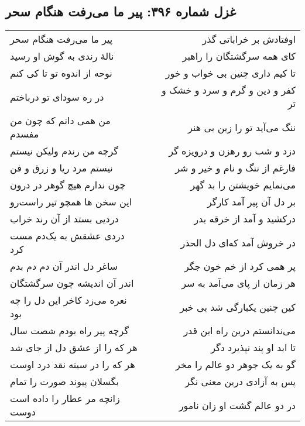 \begin{center}
\section*{غزل شماره ۳۹۶: پیر ما می‌رفت هنگام سحر}
\label{sec:396}
\begin{longtable}{l p{0.5cm} r}
پیر ما می‌رفت هنگام سحر
&&
اوفتادش بر خراباتی گذر
\\
نالهٔ رندی به گوش او رسید
&&
کای همه سرگشتگان را راهبر
\\
نوحه از اندوه تو تا کی کنم
&&
تا کیم داری چنین بی خواب و خور
\\
در ره سودای تو درباختم
&&
کفر و دین و گرم و سرد و خشک و تر
\\
من همی دانم که چون من مفسدم
&&
ننگ می‌آید تو را زین بی هنر
\\
گرچه من رندم ولیکن نیستم
&&
دزد و شب رو رهزن و درویزه گر
\\
نیستم مرد ریا و زرق و فن
&&
فارغم از ننگ و نام و خیر و شر
\\
چون ندارم هیچ گوهر در درون
&&
می‌نمایم خویشتن را بد گهر
\\
این سخن ها همچو تیر راست‌رو
&&
بر دل آن پیر آمد کارگر
\\
دردیی بستد از آن رند خراب
&&
درکشید و آمد از خرقه بدر
\\
دردی عشقش به یک‌دم مست کرد
&&
در خروش آمد که‌ای دل الحذر
\\
ساغر دل اندر آن دم دم بدم
&&
پر همی کرد از خم خون جگر
\\
اندر آن اندیشه چون سرگشتگان
&&
هر زمان از پای می‌آمد به سر
\\
نعره می‌زد کاخر این دل را چه بود
&&
کین چنین یکبارگی شد بی خبر
\\
گرچه پیر راه بودم شصت سال
&&
می‌ندانستم درین راه این قدر
\\
هر که را از عشق دل از جای شد
&&
تا ابد او پند نپذیرد دگر
\\
هر که را در سینه نقد درد اوست
&&
گو به یک جوهر دو عالم را مخر
\\
بگسلان پیوند صورت را تمام
&&
پس به آزادی درین معنی نگر
\\
زانچه مر عطار را داده است دوست
&&
در دو عالم گشت او زان نامور
\\
\end{longtable}
\end{center}
